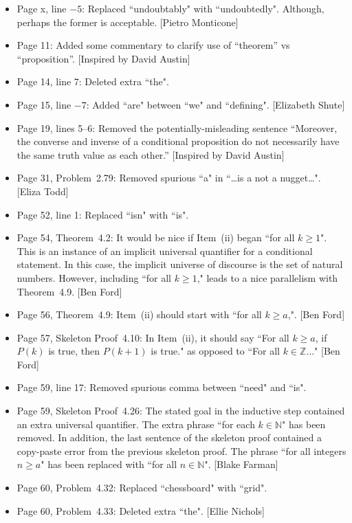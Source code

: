 \documentclass[11pt]{article}%
\begin{document}
\begin{itemize}
\item Page x, line $-5$: Replaced ``undoubtably" with ``undoubtedly". Although, perhaps the former is acceptable. [Pietro Monticone]
\item Page 11: Added some commentary to clarify use of ``theorem'' vs ``proposition''. [Inspired by David Austin]
\item Page 14, line 7: Deleted extra ``the".
\item Page 15, line $-7$: Added ``are" between ``we" and ``defining". [Elizabeth Shute]
\item Page 19, lines 5--6: Removed the potentially-misleading sentence ``Moreover, the converse and inverse of a conditional proposition do not necessarily have the same truth value as each other.'' [Inspired by David Austin]
\item Page 31, Problem~2.79: Removed spurious ``a" in ``\ldots is a not a nugget\ldots". [Eliza Todd]
\item Page 52, line 1: Replaced ``isn" with ``is".
\item Page 54, Theorem~4.2: It would be nice if Item~(ii) began ``for all $k\geq 1$".  This is an instance of an implicit universal quantifier for a conditional statement.  In this case, the implicit universe of discourse is the set of natural numbers.  However, including ``for all $k\geq 1$," leads to a nice parallelism with Theorem~4.9. [Ben Ford]
\item Page 56, Theorem~4.9: Item~(ii) should start with ``for all $k\geq a$,". [Ben Ford]
\item Page 57, Skeleton Proof~4.10: In Item~(ii), it should say ``For all $k\geq a$, if $P(k)$ is true, then $P(k+1)$ is true." as opposed to ``For all $k\in\mathbb{Z}\ldots$" [Ben Ford]
\item Page 59, line 17: Removed spurious comma between ``need" and ``is".
\item Page 59, Skeleton Proof~4.26: The stated goal in the inductive step contained an extra universal quantifier.  The extra phrase ``for each $k \in \mathbb{N}$" has been removed.  In addition, the last sentence of the skeleton proof contained a copy-paste error from the previous skeleton proof.  The phrase ``for all integers $n \ge a$" has been replaced with ``for all $n\in\mathbb{N}$". [Blake Farman]
\item Page 60, Problem~4.32: Replaced ``chessboard" with ``grid".
\item Page 60, Problem~4.33: Deleted extra ``the". [Ellie Nichols]

\end{itemize}
\end{document}
